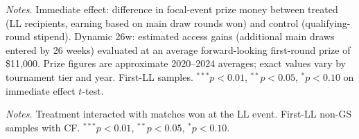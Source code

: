 
\begin{table}[htbp]
\centering
\caption{Prize Money Effect of First-Time LL Entry (USD)}
\label{tab:prize}
\begin{threeparttable}
\small

\begin{tablenotes}
\footnotesize
\item \textit{Notes.} Immediate effect: difference in focal-event prize money between treated (LL recipients, earning based on main draw rounds won) and control (qualifying-round stipend). Dynamic 26w: estimated access gains (additional main draws entered by 26 weeks) evaluated at an average forward-looking first-round prize of \$11,000. Prize figures are approximate 2020--2024 averages; exact values vary by tournament tier and year. First-LL samples. $^{***}p<0.01$, $^{**}p<0.05$, $^{*}p<0.10$ on immediate effect $t$-test.
\end{tablenotes}
\end{threeparttable}
\end{table}


\begin{table}[htbp]
\centering
\caption{Dose-Response: Non-Grand-Slam (First-LL)}
\label{tab:dose_ngs}
\begin{threeparttable}
\small

\begin{tablenotes}
\footnotesize
\item \textit{Notes.} Treatment interacted with matches won at the LL event. First-LL non-GS samples with CF. $^{***}p<0.01$, $^{**}p<0.05$, $^{*}p<0.10$.
\end{tablenotes}
\end{threeparttable}
\end{table}
